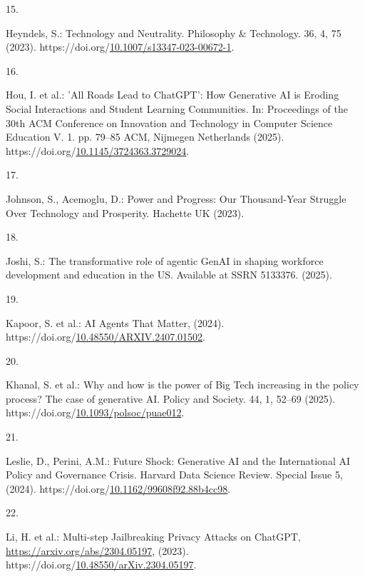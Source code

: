 \documentclass[
  letterpaper,
  DIV=11,
  numbers=noendperiod]{scrartcl}
\newlength{\cslhangindent}
\newlength{\csllabelwidth}
\newenvironment{CSLReferences}[2] %
 {\begin{list}{}{%
  \setlength{\itemindent}{0pt}
  \setlength{\leftmargin}{0pt}
  \setlength{\parsep}{0pt}
  \ifodd #1
   \setlength{\leftmargin}{\cslhangindent}
   \setlength{\itemindent}{-1\cslhangindent}
  \fi
  \setlength{\itemsep}{#2\baselineskip}}}
 {\end{list}}
\newcommand{\CSLLeftMargin}[1]{\parbox[t]{\csllabelwidth}{\strut#1\strut}}
\newcommand{\CSLRightInline}[1]{\parbox[t]{\linewidth - \csllabelwidth}{\strut#1\strut}}
\begin{document}
\begin{CSLReferences}{0}{0}
\CSLLeftMargin{15. }%
\CSLRightInline{Heyndels, S.: Technology and {Neutrality}. Philosophy \&
Technology. 36, 4, 75 (2023).
https://doi.org/\href{https://doi.org/10.1007/s13347-023-00672-1}{10.1007/s13347-023-00672-1}.}

\CSLLeftMargin{16. }%
\CSLRightInline{Hou, I. et al.: '{All Roads Lead} to {ChatGPT}': {How
Generative AI} is {Eroding Social Interactions} and {Student Learning
Communities}. In: Proceedings of the 30th {ACM Conference} on
{Innovation} and {Technology} in {Computer Science Education V}. 1. pp.
79--85 ACM, Nijmegen Netherlands (2025).
https://doi.org/\href{https://doi.org/10.1145/3724363.3729024}{10.1145/3724363.3729024}.}

\CSLLeftMargin{17. }%
\CSLRightInline{Johnson, S., Acemoglu, D.: Power and {Progress}: {Our
Thousand-Year Struggle Over Technology} and {Prosperity}. Hachette UK
(2023).}

\CSLLeftMargin{18. }%
\CSLRightInline{Joshi, S.: The transformative role of agentic {GenAI} in
shaping workforce development and education in the {US}. Available at
SSRN 5133376. (2025).}

\CSLLeftMargin{19. }%
\CSLRightInline{Kapoor, S. et al.: {AI Agents That Matter}, (2024).
https://doi.org/\href{https://doi.org/10.48550/ARXIV.2407.01502}{10.48550/ARXIV.2407.01502}.}

\CSLLeftMargin{20. }%
\CSLRightInline{Khanal, S. et al.: Why and how is the power of {Big
Tech} increasing in the policy process? {The} case of generative {AI}.
Policy and Society. 44, 1, 52--69 (2025).
https://doi.org/\href{https://doi.org/10.1093/polsoc/puae012}{10.1093/polsoc/puae012}.}

\CSLLeftMargin{21. }%
\CSLRightInline{Leslie, D., Perini, A.M.: Future {Shock}: {Generative
AI} and the {International AI Policy} and {Governance Crisis}. Harvard
Data Science Review. Special Issue 5, (2024).
https://doi.org/\href{https://doi.org/10.1162/99608f92.88b4cc98}{10.1162/99608f92.88b4cc98}.}

\CSLLeftMargin{22. }%
\CSLRightInline{Li, H. et al.: Multi-step {Jailbreaking Privacy Attacks}
on {ChatGPT}, \url{https://arxiv.org/abs/2304.05197}, (2023).
https://doi.org/\href{https://doi.org/10.48550/arXiv.2304.05197}{10.48550/arXiv.2304.05197}.}


\end{CSLReferences}
\end{document}
